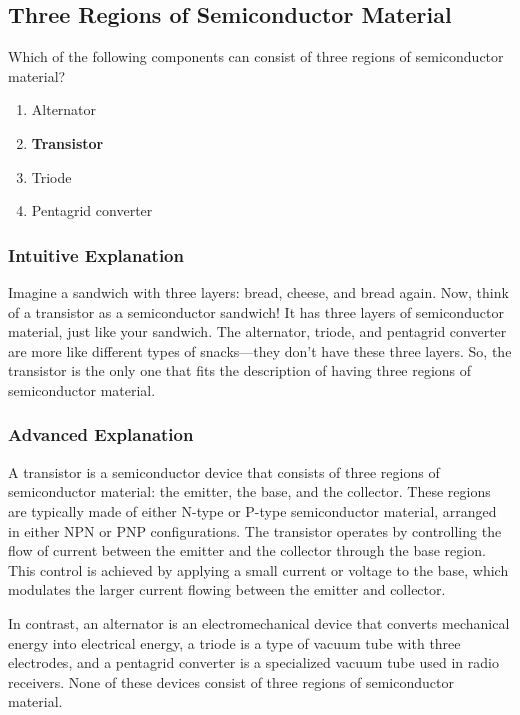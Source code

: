 \subsection{Three Regions of Semiconductor Material}
\label{T6B04}

\begin{tcolorbox}[colback=gray!10!white,colframe=black!75!black,title=T6B04]
Which of the following components can consist of three regions of semiconductor material?
\begin{enumerate}[label=\Alph*)]
    \item Alternator
    \item \textbf{Transistor}
    \item Triode
    \item Pentagrid converter
\end{enumerate}
\end{tcolorbox}

\subsubsection{Intuitive Explanation}
Imagine a sandwich with three layers: bread, cheese, and bread again. Now, think of a transistor as a semiconductor sandwich! It has three layers of semiconductor material, just like your sandwich. The alternator, triode, and pentagrid converter are more like different types of snacks—they don’t have these three layers. So, the transistor is the only one that fits the description of having three regions of semiconductor material.

\subsubsection{Advanced Explanation}
A transistor is a semiconductor device that consists of three regions of semiconductor material: the emitter, the base, and the collector. These regions are typically made of either N-type or P-type semiconductor material, arranged in either NPN or PNP configurations. The transistor operates by controlling the flow of current between the emitter and the collector through the base region. This control is achieved by applying a small current or voltage to the base, which modulates the larger current flowing between the emitter and collector. 

In contrast, an alternator is an electromechanical device that converts mechanical energy into electrical energy, a triode is a type of vacuum tube with three electrodes, and a pentagrid converter is a specialized vacuum tube used in radio receivers. None of these devices consist of three regions of semiconductor material.

